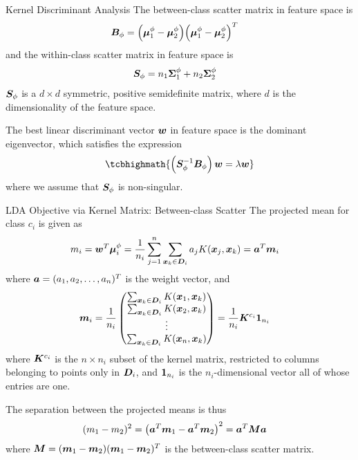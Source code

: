 \begin{frame}{Kernel Discriminant Analysis} 
The between-class scatter matrix in feature space is
\begin{align*}
  {\boldsymbol B}_\phi & = \Bigl({\bm \mu}_1^\phi - {\bm \mu}_2^\phi\Bigr)
  \Bigl({\bm \mu}_1^\phi - {\bm \mu}_2^\phi\Bigr)^T
\end{align*}
and the within-class scatter matrix in feature space is
\begin{align*}
  {\boldsymbol S}_\phi &= n_1{\bm \Sigma}_1^\phi + n_2{\bm \Sigma}_2^\phi
\end{align*}
${\boldsymbol S}_\phi$ is a $d \times d$ symmetric, positive semidef\/{i}nite
matrix, where $d$ is the dimensionality of the feature space. 

\medskip
The best linear
discriminant vector ${\boldsymbol w}$ in feature space is the dominant
eigenvector, which satisf\/{i}es the expression
\begin{align*}
\tcbhighmath{
  \lB(\bS_\phi^{-1}\bB_\phi\rB) \bw = \lambda \bw
}
 \label{eq:class:lda:eigeqF}
\end{align*}
where we assume that ${\boldsymbol S}_\phi$ is non-singular. 
\end{frame}


\begin{frame}{LDA Objective via Kernel Matrix: Between-class Scatter}
\small
The projected mean for class $c_i$ is given as
\begin{align*}
   m_i & = {\boldsymbol w}^T {\bm \mu}^\phi_i
   = {1 \over n_i} \displaystyle \sum_{j=1}^n \displaystyle \sum_{{\boldsymbol x}_k \in {\boldsymbol D}_i} a_{j}
  K({\boldsymbol x}_{j},{\boldsymbol x}_k) = {\boldsymbol a}^T {\boldsymbol m}_i 
\end{align*}
where ${\boldsymbol a} = (a_1, a_2, \ldots, a_n)^T$ is the weight vector, and
\begin{align*}
  {\boldsymbol m}_i & = {1 \over n_i}
  \begin{pmatrix} 
      \sum_{{\boldsymbol x}_k \in {\boldsymbol D}_i} K({\boldsymbol x}_1,{\boldsymbol x}_k)\\
      \sum_{{\boldsymbol x}_k \in {\boldsymbol D}_i} K({\boldsymbol x}_2,{\boldsymbol x}_k)\\
      \vdots\\
      \sum_{{\boldsymbol x}_k \in {\boldsymbol D}_i} K({\boldsymbol x}_n,{\boldsymbol x}_k)
       \end{pmatrix}  = {1\over n_i}{\boldsymbol K}^{c_i} \mathbf{1}_{n_i}
\end{align*}
where ${\boldsymbol K}^{c_i}$ is the $n \times n_i$ subset of the kernel
matrix, restricted to columns belonging to points only in ${\boldsymbol D}_i$,
and $\mathbf{1}_{n_i}$ is the $n_i$-dimensional vector all of whose
entries are one. 

\medskip
The separation between the projected means is thus
\begin{align*}
  (m_1 - m_2)^2  & =  \left({\boldsymbol a}^T{\boldsymbol m}_1 - {\boldsymbol a}^T{\boldsymbol m}_2\right)^2 
     =  {\boldsymbol a}^T{\boldsymbol M}{\boldsymbol a}
\end{align*}
where ${\boldsymbol M} = ({\boldsymbol m}_1 - {\boldsymbol m}_2)({\boldsymbol m}_1-{\boldsymbol m}_2)^T$ is the
between-class scatter matrix.
\end{frame}



